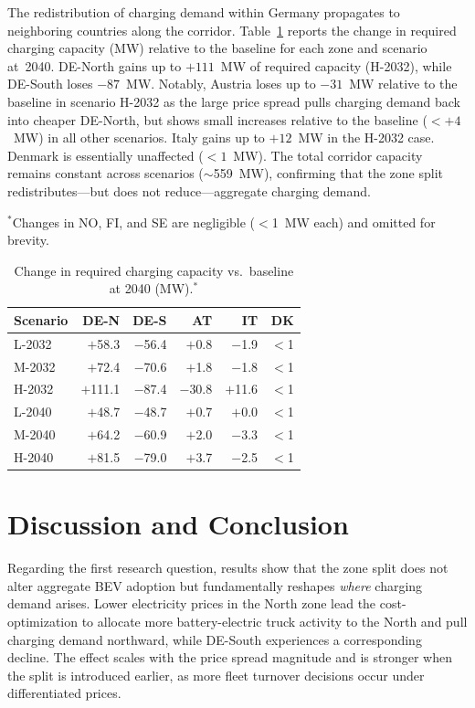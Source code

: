 \documentclass[conference]{IEEEtran}
\begin{document}
The redistribution of charging demand within Germany propagates to neighboring countries along the corridor. Table~\ref{tab:mw_delta} reports the change in required charging capacity (MW) relative to the baseline for each zone and scenario at~2040. DE-North gains up to $+111$~MW of required capacity (H-2032), while DE-South loses $-87$~MW. Notably, Austria loses up to $-31$~MW relative to the baseline in scenario H-2032 as the large price spread pulls charging demand back into cheaper DE-North, but shows small increases relative to the baseline ($<+4$~MW) in all other scenarios. Italy gains up to $+12$~MW in the H-2032 case. Denmark is essentially unaffected ($<1$~MW). The total corridor capacity remains constant across scenarios ($\sim$559~MW), confirming that the zone split redistributes---but does not reduce---aggregate charging demand.
\begin{table}[htbp]
\caption{Change in required charging capacity vs.\ baseline at 2040 (MW).$^{*}$}
\vspace{-2pt}
\raggedright\scriptsize $^{*}$Changes in NO, FI, and SE are negligible ($<$1~MW each) and omitted for brevity.
\label{tab:mw_delta}
\begin{center}
\footnotesize
\begin{tabular}{@{}l r r r r r@{}}
\toprule
\textbf{Scenario} & \textbf{DE-N} & \textbf{DE-S} & \textbf{AT} & \textbf{IT} & \textbf{DK} \\
\midrule
L-2032 & $+$58.3 & $-$56.4 & $+$0.8 & $-$1.9 & $<$1 \\
M-2032 & $+$72.4 & $-$70.6 & $+$1.8 & $-$1.8 & $<$1 \\
\rowcolor[gray]{0.85} H-2032 & $+$111.1 & $-$87.4 & $-$30.8 & $+$11.6 & $<$1 \\
\midrule
L-2040 & $+$48.7 & $-$48.7 & $+$0.7 & $+$0.0 & $<$1 \\
M-2040 & $+$64.2 & $-$60.9 & $+$2.0 & $-$3.3 & $<$1 \\
H-2040 & $+$81.5 & $-$79.0 & $+$3.7 & $-$2.5 & $<$1 \\
\bottomrule
\end{tabular}
\end{center}
\end{table}

\section{Discussion and Conclusion}

Regarding the first research question, results show that the zone split does not alter aggregate BEV adoption but fundamentally reshapes \emph{where} charging demand arises. Lower electricity prices in the North zone lead the cost-optimization to allocate more battery-electric truck activity to the North and pull charging demand northward, while DE-South experiences a corresponding decline. The effect scales with the price spread magnitude and is stronger when the split is introduced earlier, as more fleet turnover decisions occur under differentiated prices.
\end{document}
